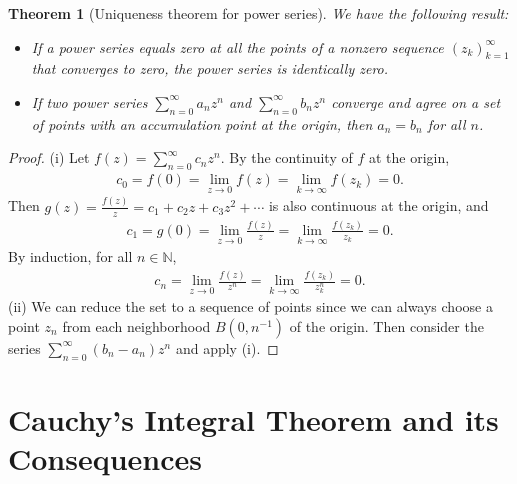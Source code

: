 \documentclass{article}
\numberwithin{equation}{section}
\newcommand{\bbN}{\mathbb{N}}
\theoremstyle{plain}
\newtheorem{theorem}{Theorem}[section]
\theoremstyle{definition}
\begin{document}
\begin{theorem}[Uniqueness theorem for power series]\label{pwsruniq}
We have the following result:
\begin{itemize}
\item[(i)] If a power series equals zero at all the points of a nonzero sequence $(z_k)_{k=1}^\infty$ that converges to zero, the power series is identically zero.
\item[(ii)] If two power series $\sum_{n=0}^\infty a_nz^n$ and $\sum_{n=0}^\infty b_nz^n$ converge and agree on a set of points with an accumulation point at the origin, then $a_n = b_n$ for all $n$.
\end{itemize}
\end{theorem}
\begin{proof}
(i) Let $f(z)=\sum_{n=0}^\infty c_nz^n$. By the continuity of $f$ at the origin, 
\begin{align*}
	c_0=f(0)=\lim_{z\to 0} f(z)=\lim_{k\to\infty} f(z_k)=0.
\end{align*}
Then $g(z)=\frac{f(z)}{z}=c_1+c_2z+c_3z^2+\cdots$ is also continuous at the origin, and 
\begin{align*}
	c_1=g(0)=\lim_{z\to 0}\frac{f(z)}{z}=\lim_{k\to\infty}\frac{f(z_k)}{z_k}=0.
\end{align*}
By induction, for all $n\in\bbN$,
\begin{align*}
	c_n=\lim_{z\to 0}\frac{f(z)}{z^n}=\lim_{k\to\infty}\frac{f(z_k)}{z_k^n}=0.
\end{align*}
(ii) We can reduce the set to a sequence of points since we can always choose a point $z_n$ from each neighborhood $B(0,n^{-1})$ of the origin. Then consider the series $\sum_{n=0}^\infty(b_n-a_n)z^n$ and apply (i).
\end{proof}

\newpage
\section{Cauchy's Integral Theorem and its Consequences}
\end{document}
